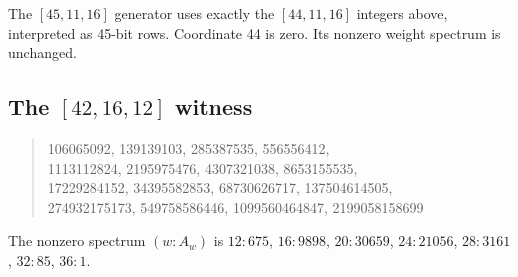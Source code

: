 The $[45,11,16]$ generator uses exactly the $[44,11,16]$ integers above, interpreted as 45-bit rows. Coordinate 44 is zero. Its nonzero weight spectrum is unchanged.

\subsection{The $[42,16,12]$ witness}
\begin{quote}\ttfamily\small
106065092, 139139103, 285387535, 556556412,\\
1113112824, 2195975476, 4307321038, 8653155535,\\
17229284152, 34395582853, 68730626717, 137504614505,\\
274932175173, 549758586446, 1099560464847, 2199058158699
\end{quote}
The nonzero spectrum $(w:A_w)$ is $12:675$, $16:9898$, $20:30659$, $24:21056$, $28:3161$, $32:85$, $36:1$.

\clearpage
